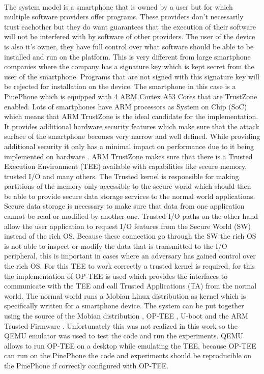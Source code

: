 \paragraph*{}
The system model is a smartphone that is owned by a user but for which multiple software providers offer programs. These providers don't necessarily trust eachother but they do want guarantees that the execution of their software will not be interfered with by software of other providers. The user of the device is also it's owner, they have full control over what software should be able to be installed and run on the platform. This is very different from large smartphone companies where the company has a signature key which is kept secret from the user of the smartphone. Programs that are not signed with this signature key will be rejected for installation on the device. The smartphone in this case is a PinePhone which is equipped with 4 ARM Cortex A53 Cores that are TrustZone enabled. Lots of smartphones have ARM processors as System on Chip (SoC) which means that ARM TrustZone is the ideal candidate for the implementation. It provides additional hardware security features which make sure that the attack surface of the smartphone becomes very narrow and well defined. While providing additional security it only has a minimal impact on performance due to it being implemented on hardware \cite{AmacherJulien2019Otpo} \cite{HuaZhichao2021Tpcf}. ARM TrustZone makes sure that there is a Trusted Execution Environment (TEE) available with capabilities like secure memory, trusted I/O and many others. The Trusted kernel is responsible for making partitions of the memory only accessible to the secure world which should then be able to provide secure data storage services to the normal world applications. Secure data storage is necessary to make sure that data from one application cannot be read or modified by another one. Trusted I/O paths on the other hand allow the user application to request I/O features from the Secure World (SW) instead of the rich OS. Because these connection go through the SW the rich OS is not able to inspect or modify the data that is transmitted to the I/O peripheral, this is important in cases where an adversary has gained control over the rich OS. For this TEE to work correctly a trusted kernel is required, for this the implementation of OP-TEE is used which provides the interfaces to communicate with the TEE and call Trusted Applications (TA) from the normal world. The normal world runs a Mobian Linux distribution as kernel which is specifically written for a smartphone device. The system can be put together using the source of the Mobian distribution \cite{mobian}, OP-TEE \cite{OPTEEgit}, U-boot \cite{u-boot} and the ARM Trusted Firmware \cite{ARMfirmware}. Unfortunately this was not realized in this work so the QEMU emulator \cite{QEMU} was used to test the code and run the experiments. QEMU allows to run OP-TEE on a desktop while emulating the TEE, because OP-TEE can run on the PinePhone the code and experiments should be reproducible on the PinePhone if correctly configured with OP-TEE.

